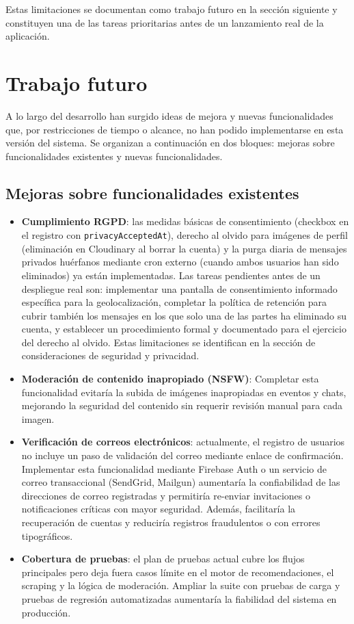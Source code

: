 Estas limitaciones se documentan como trabajo futuro en la sección siguiente y constituyen una de las tareas prioritarias antes de un lanzamiento real de la aplicación.


\section{Trabajo futuro}

A lo largo del desarrollo han surgido ideas de mejora y nuevas funcionalidades que, por restricciones de tiempo o alcance, no han podido implementarse en esta versión del sistema. Se organizan a continuación en dos bloques: mejoras sobre funcionalidades existentes y nuevas funcionalidades.

\subsection{Mejoras sobre funcionalidades existentes}

\begin{itemize}
    \item \textbf{Cumplimiento RGPD}: las medidas básicas de consentimiento (checkbox en el registro con \texttt{privacyAcceptedAt}), derecho al olvido para imágenes de perfil (eliminación en Cloudinary al borrar la cuenta) y la purga diaria de mensajes privados huérfanos mediante cron externo (cuando ambos usuarios han sido eliminados) ya están implementadas. Las tareas pendientes antes de un despliegue real son: implementar una pantalla de consentimiento informado específica para la geolocalización, completar la política de retención para cubrir también los mensajes en los que solo una de las partes ha eliminado su cuenta, y establecer un procedimiento formal y documentado para el ejercicio del derecho al olvido. Estas limitaciones se identifican en la sección de consideraciones de seguridad y privacidad.

    \item \textbf{Moderación de contenido inapropiado (NSFW)}: Completar esta funcionalidad evitaría la subida de imágenes inapropiadas en eventos y chats, mejorando la seguridad del contenido sin requerir revisión manual para cada imagen.

    \item \textbf{Verificación de correos electrónicos}: actualmente, el registro de usuarios no incluye un paso de validación del correo mediante enlace de confirmación. Implementar esta funcionalidad mediante Firebase Auth o un servicio de correo transaccional (SendGrid, Mailgun) aumentaría la confiabilidad de las direcciones de correo registradas y permitiría re-enviar invitaciones o notificaciones críticas con mayor seguridad. Además, facilitaría la recuperación de cuentas y reduciría registros fraudulentos o con errores tipográficos.

    \item \textbf{Cobertura de pruebas}: el plan de pruebas actual cubre los flujos principales pero deja fuera casos límite en el motor de recomendaciones, el scraping y la lógica de moderación. Ampliar la suite con pruebas de carga y pruebas de regresión automatizadas aumentaría la fiabilidad del sistema en producción.
\end{itemize}

